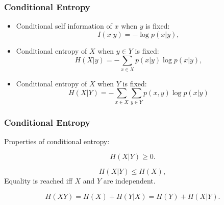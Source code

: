 \documentclass[14pt]{beamer}
\begin{document}


\begin{frame}
\frametitle{Conditional Entropy}
\begin{itemize}

    \item Conditional self information of $x$ when $y$ is fixed:
    \[
    I(x\vert y) = - \log p(x\vert y),
    \]
    
    \item Conditional entropy of $X$ when $y \in Y$ is fixed:
    \begin{equation}
    \label{eq9}
    H(X\vert y) = - \sum\limits_{x \in X} {p(x\vert y)\log p(x\vert y)} ,
    \end{equation}
    
    \item Conditional entropy of $X$ when $Y$ is fixed:
    \[
    H(X\vert Y) = - \sum\limits_{x \in X} {\sum\limits_{y \in Y} {p(x,y)\log
    p(x\vert y)} }
    \]
    
\end{itemize}
\end{frame}



\begin{frame}
\frametitle{Conditional Entropy}
Properties of conditional entropy:
\begin{itemize}
\footnotesize {

    \item[1]
    \begin{prop}
    \label{CE1} \[H(X\vert Y) \ge 0.\]
    \end{prop}

    \item[2]
    \begin{prop}\label{CE2}
    \[H(X\vert Y) \le H(X),\]
    Equality is reached iff $X$ and $Y$ are independent.
    \end{prop}

    \item[3]
    \begin{prop}\label{CE3}
    \[H(XY) = H(X) + H(Y\vert X) = H(Y) + H(X\vert Y).\]
    \end{prop}
}    
\end{itemize}
\end{frame}
\end{document}
